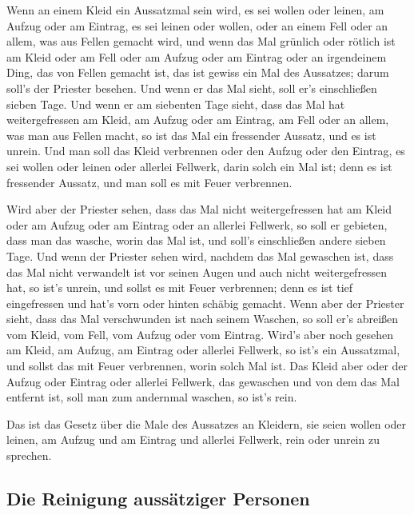  Wenn an einem Kleid ein Aussatzmal sein wird, es sei
wollen oder leinen,  am Aufzug oder am Eintrag, es sei
leinen oder wollen, oder an einem Fell oder an allem, was aus Fellen
gemacht wird,  und wenn das Mal grünlich oder rötlich ist
am Kleid oder am Fell oder am Aufzug oder am Eintrag oder an irgendeinem
Ding, das von Fellen gemacht ist, das ist gewiss ein Mal des Aussatzes;
darum soll's der Priester besehen.  Und wenn er das Mal
sieht, soll er's einschließen sieben Tage.  Und wenn er
am siebenten Tage sieht, dass das Mal hat weitergefressen am Kleid, am
Aufzug oder am Eintrag, am Fell oder an allem, was man aus Fellen macht,
so ist das Mal ein fressender Aussatz, und es ist unrein.
 Und man soll das Kleid verbrennen oder den Aufzug oder
den Eintrag, es sei wollen oder leinen oder allerlei Fellwerk, darin
solch ein Mal ist; denn es ist fressender Aussatz, und man soll es mit
Feuer verbrennen.

 Wird aber der Priester sehen, dass das Mal nicht
weitergefressen hat am Kleid oder am Aufzug oder am Eintrag oder an
allerlei Fellwerk,  so soll er gebieten, dass man das
wasche, worin das Mal ist, und soll's einschließen andere sieben Tage.
 Und wenn der Priester sehen wird, nachdem das Mal
gewaschen ist, dass das Mal nicht verwandelt ist vor seinen Augen und
auch nicht weitergefressen hat, so ist's unrein, und sollst es mit Feuer
verbrennen; denn es ist tief eingefressen und hat's vorn oder hinten
schäbig gemacht.  Wenn aber der Priester sieht, dass das
Mal verschwunden ist nach seinem Waschen, so soll er's abreißen vom
Kleid, vom Fell, vom Aufzug oder vom Eintrag.  Wird's
aber noch gesehen am Kleid, am Aufzug, am Eintrag oder allerlei
Fellwerk, so ist's ein Aussatzmal, und sollst das mit Feuer verbrennen,
worin solch Mal ist.  Das Kleid aber oder der Aufzug oder
Eintrag oder allerlei Fellwerk, das gewaschen und von dem das Mal
entfernt ist, soll man zum andernmal waschen, so ist's rein.

 Das ist das Gesetz über die Male des Aussatzes an
Kleidern, sie seien wollen oder leinen, am Aufzug und am Eintrag und
allerlei Fellwerk, rein oder unrein zu sprechen.

\hypertarget{die-reinigung-aussuxe4tziger-personen}{%
\subsection{Die Reinigung aussätziger
Personen}\label{die-reinigung-aussuxe4tziger-personen}}

